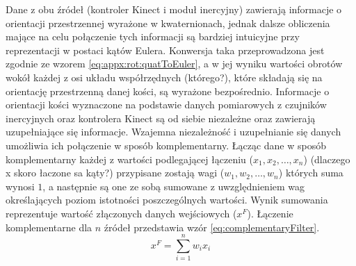 Dane z obu źródeł (kontroler Kinect i moduł inercyjny) zawierają informacje o orientacji przestrzennej wyrażone w kwaternionach, jednak dalsze obliczenia mające na celu połączenie tych informacji są bardziej intuicyjne przy reprezentacji w postaci kątów Eulera. Konwersja taka przeprowadzona jest zgodnie ze wzorem \eqref{eq:appx:rot:quatToEuler}, a w jej wyniku wartości obrotów wokół każdej z osi układu współrzędnych (którego?), które składają się na orientację przestrzenną danej kości, są wyrażone bezpośrednio. Informacje o orientacji kości wyznaczone na podstawie danych pomiarowych z czujników inercyjnych oraz kontrolera Kinect są od siebie niezależne oraz zawierają uzupełniające się informacje. Wzajemna niezależność i uzupełnianie się danych umożliwia ich połączenie w sposób komplementarny. Łącząc dane w sposób komplementarny każdej z wartości podlegającej łączeniu ($x_1, x_2,\ldots, x_n$) (dlaczego x skoro łaczone sa kąty?) przypisane zostają wagi ($w_1,w_2,\ldots,w_n$) których suma wynosi $1$, a następnie są one ze sobą sumowane z uwzględnieniem wag określających poziom istotności poszczególnych wartości. Wynik sumowania reprezentuje wartość złączonych danych wejściowych ($x^F$). Łączenie komplementarne dla $n$ źródeł przedstawia wzór \eqref{eq:complementaryFilter}.
\begin{equation}
x^F = \sum_{i=1}^{n}{w_i x_i}
\label{eq:complementaryFilter}
\end{equation}

